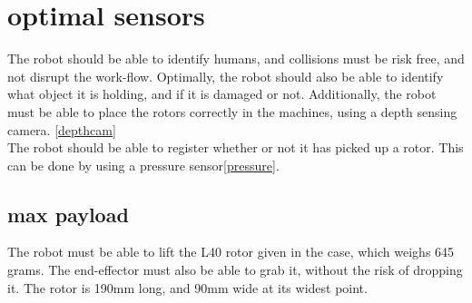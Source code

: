 \section{optimal sensors}

The robot should be able to identify humans, and collisions must be risk free, and not disrupt the work-flow. Optimally, the robot should also be able to identify what object it is holding, and if it is damaged or not. Additionally, the robot must be able to place the rotors correctly in the machines, using a depth sensing camera. \ref{depthcam}\\
The robot should be able to register whether or not it has picked up a rotor. This can be done by using a pressure sensor\ref{pressure}. 

\subsection{max payload}

The robot must be able to lift the L40 rotor given in the case, which weighs 645 grams. The end-effector must also be able to grab it, without the risk of dropping it. The rotor is 190mm long, and 90mm wide at its widest point. 
















